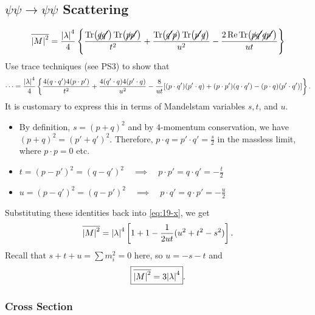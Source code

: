 
\subsection{\texorpdfstring{$\psi\psi \to\psi\psi$}{Psi-Psi} Scattering}%
\label{sub:psi_psi_scattering}

\begin{equation}
  \overline{\abs{M}^2} = \frac{\abs{\lambda}^4}{4} \left\{ \frac{\Tr(\cancel{q} \cancel{q'}) \Tr( \cancel{p} \cancel{p'})}{t^2} + \frac{\Tr(\cancel{q'}\cancel{p}) \Tr(\cancel{p'}\cancel{q})}{u^2} - \frac{2 \Re \Tr(\cancel{p} \cancel{q'} \cancel{q} \cancel{p'})}{ut} \right\}
\end{equation}
Use trace techniques (see PS3) to show that
\begin{equation}
  \label{eq:19-x}
  \dots = \frac{\abs{\lambda}^4}{4} \left\{ \frac{4 (q \cdot q') 4 (p \cdot p')}{t^2} + \frac{4 (q' \cdot q) 4 (p' \cdot q)}{u^2} - \frac{8}{ut} [(p \cdot q') (p' \cdot q) + (p \cdot p') (q \cdot q') - (p \cdot q) (p' \cdot q')] \right\}.
\end{equation}
It is customary to express this in terms of Mandelstam variables $s, t$, and $u$.
 \begin{itemize}
   \item By definition, $s = (p+q)^2$ and by $4$-momentum conservation, we have  $(p + q)^2 = (p' + q')^2$. Therefore, $p \cdot q = p' \cdot q' = \frac{s}{2}$ in the massless limit, where $p \cdot p = 0$ etc.
   \item $t = (p - p')^2 = (q - q')^2 \quad \implies \quad p \cdot p' = q \cdot q' = -\frac{t}{2}$
   \item $u = (p - q')^2 = (q - p')^2 \quad \implies \quad p \cdot q' = q \cdot p' = -\frac{u}{2}$
\end{itemize}
Substituting these identities back into \eqref{eq:19-x}, we get
\begin{equation}
  \overline{\abs{M}^2} = \abs{\lambda}^4 \left[ 1 +1 - \frac{1}{2 ut} (u^2 + t^2 - s^2) \right].
\end{equation}
Recall that $s + t + u = \sum m_{i}^2 = 0$  here, so $u = -s - t$  and 
\begin{equation}
  \boxed{\overline{\abs{M}^2} = 3 \abs{\lambda}^4}.
\end{equation}

\subsubsection{Cross Section}%
\label{subsub:cross_section}

